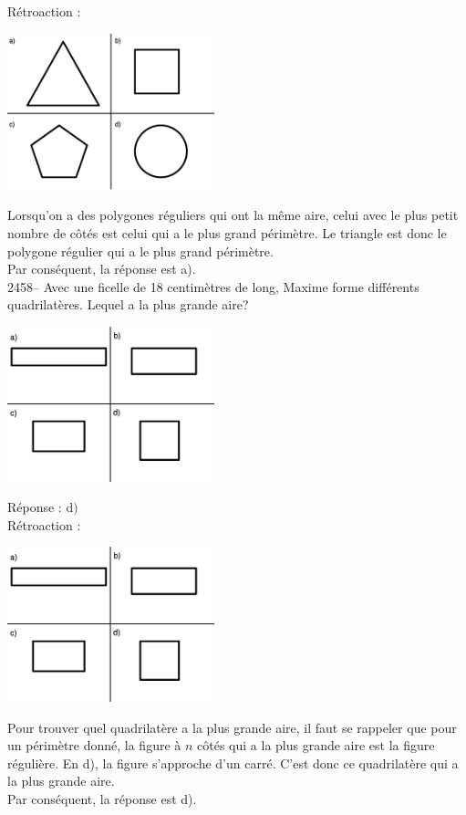\documentclass[letterpaper, 12pt]{article}
\begin{document}
R\'etroaction :\\
\begin{center}
 \includegraphics[width=6cm,bb=0 0 735 555]{Q2456.eps}
\end{center}
Lorsqu'on a des polygones r\'eguliers qui ont la m\^eme aire, celui avec le plus petit nombre de c\^ot\'es est celui qui a le plus grand p\'erim\`etre. Le triangle est donc le polygone r\'egulier qui a le plus grand p\'erim\`etre.\\
Par cons\'equent, la r\'eponse est a).\\

2458-- Avec une ficelle de 18 centim\`etres de long, Maxime forme diff\'erents quadrilat\`eres. Lequel a la plus grande aire?\\
\begin{center}
 \includegraphics[width=6cm,bb=0 0 684 512]{Q2458.eps}
\end{center}

R\'eponse : d$)$\\

R\'etroaction :\\
\begin{center}
 \includegraphics[width=6cm,bb=0 0 684 512]{Q2458.eps}
\end{center}
Pour trouver quel quadrilat\`ere a la plus grande aire, il faut se rappeler que pour un p\'erim\`etre donn\'e, la figure \`a $n$ c\^ot\'es qui a la plus grande aire est la figure r\'eguli\`ere. En d), la figure s'approche d'un carr\'e. C'est donc ce quadrilat\`ere qui a la plus grande aire. \\
Par cons\'equent, la r\'eponse est d).\\
\end{document}
